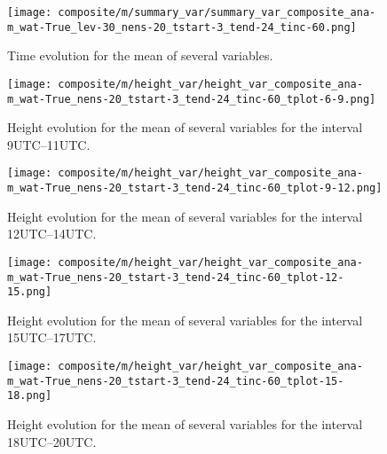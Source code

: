 \documentclass[a4paper, 12pt]{article}
\begin{document}

\begin{figure}[ht]
\noindent \centering
\texttt{[image: composite/m/summary\_var/summary\_var\_composite\_ana-m\_wat-True\_lev-30\_nens-20\_tstart-3\_tend-24\_tinc-60.png]}\\
\caption{Time evolution for the mean of several variables.} \label{fig:comp_summary_var}
\end{figure}


\begin{figure}[ht]
\noindent \centering
\texttt{[image: composite/m/height\_var/height\_var\_composite\_ana-m\_wat-True\_nens-20\_tstart-3\_tend-24\_tinc-60\_tplot-6-9.png]}\\
\caption{Height evolution for the mean of several variables for the interval 9UTC--11UTC.} \label{fig:comp_height_var}
\end{figure}
\begin{figure}[ht]
\noindent \centering
\texttt{[image: composite/m/height\_var/height\_var\_composite\_ana-m\_wat-True\_nens-20\_tstart-3\_tend-24\_tinc-60\_tplot-9-12.png]}\\
\caption{Height evolution for the mean of several variables for the interval 12UTC--14UTC.} 
\end{figure}
\begin{figure}[ht]
\noindent \centering
\texttt{[image: composite/m/height\_var/height\_var\_composite\_ana-m\_wat-True\_nens-20\_tstart-3\_tend-24\_tinc-60\_tplot-12-15.png]}\\
\caption{Height evolution for the mean of several variables for the interval 15UTC--17UTC.}
\end{figure}
\begin{figure}[ht]
\noindent \centering
\texttt{[image: composite/m/height\_var/height\_var\_composite\_ana-m\_wat-True\_nens-20\_tstart-3\_tend-24\_tinc-60\_tplot-15-18.png]}\\
\caption{Height evolution for the mean of several variables for the interval 18UTC--20UTC.}
\end{figure}
\end{document}
